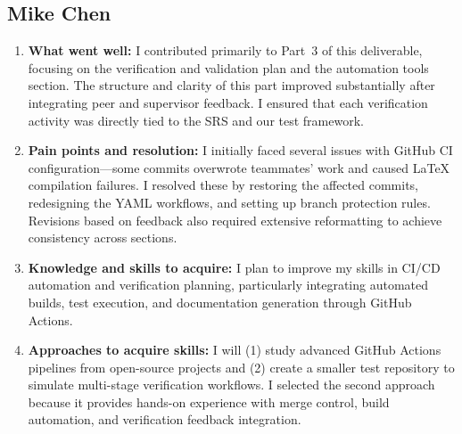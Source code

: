 \documentclass[12pt, titlepage]{article}
\begin{document}
\subsection*{Mike Chen}
\begin{enumerate}
  \item \textbf{What went well:}
        I contributed primarily to Part~3 of this deliverable, focusing on the verification and validation plan
        and the automation tools section. The structure and clarity of this part improved substantially after
        integrating peer and supervisor feedback. I ensured that each verification activity was directly tied
        to the SRS and our test framework.

  \item \textbf{Pain points and resolution:}
        I initially faced several issues with GitHub CI configuration—some commits overwrote teammates’
        work and caused LaTeX compilation failures. I resolved these by restoring the affected commits,
        redesigning the YAML workflows, and setting up branch protection rules. Revisions based on
        feedback also required extensive reformatting to achieve consistency across sections.

  \item \textbf{Knowledge and skills to acquire:}
        I plan to improve my skills in CI/CD automation and verification planning, particularly integrating
        automated builds, test execution, and documentation generation through GitHub Actions.

  \item \textbf{Approaches to acquire skills:}
        I will (1) study advanced GitHub Actions pipelines from open-source projects and (2) create a
        smaller test repository to simulate multi-stage verification workflows. I selected the second
        approach because it provides hands-on experience with merge control, build automation, and
        verification feedback integration.
\end{enumerate}
\end{document}
